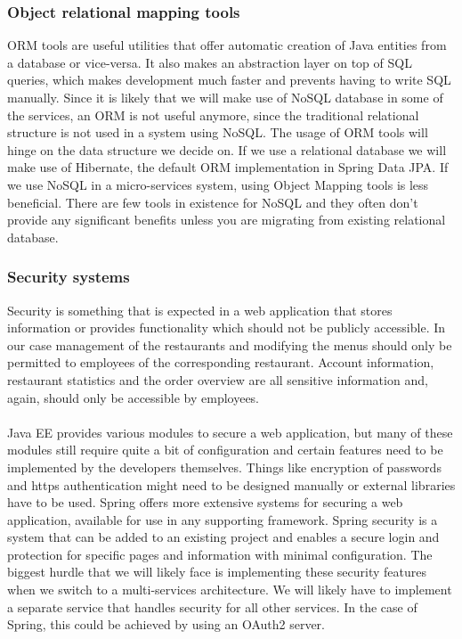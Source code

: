 \documentclass[12pt]{article}
\begin{document}
\begin{multicols}{2}
\subsubsection{Object relational mapping tools}
ORM tools are useful utilities that offer automatic creation of Java entities from a database or vice-versa. It also makes an abstraction layer on top of SQL queries, which makes development much faster and prevents having to write SQL manually. Since it is likely that we will make use of NoSQL database in some of the services, an ORM is not useful anymore, since the traditional relational structure is not used in a system using NoSQL. The usage of ORM tools will hinge on the data structure we decide on. If we use a relational database we will make use of Hibernate, the default ORM implementation in Spring Data JPA. If we use NoSQL in a micro-services system, using Object Mapping tools is less beneficial. There are few tools in existence for NoSQL and they often don't provide any significant benefits unless you are migrating from existing relational database. \cite{ormNosql85:online}
\subsubsection{Security systems}
Security is something that is expected in a web application that stores information or provides functionality which should not be publicly accessible. In our case management of the restaurants and modifying the menus should only be permitted to employees of the corresponding restaurant. Account information, restaurant statistics and the order overview are all sensitive information and, again, should only be accessible by employees.
\\\\
Java EE provides various modules to secure a web application, but many of these modules still require quite a bit of configuration and certain features need to be implemented by the developers themselves. \cite{JavaEESecurity29:online} Things like encryption of passwords and https authentication might need to be designed  manually or external libraries have to be used. Spring offers more extensive systems for securing a web application, available for use in any supporting framework. Spring security is a system that can be added to an existing project and enables a secure login and protection for specific pages and information with minimal configuration. The biggest hurdle that we will likely face is implementing these security features when we switch to a multi-services architecture. We will likely have to implement a separate service that handles security for all other services. In the case of Spring, this could be achieved by using an OAuth2 server.
\cite{SpringCloudSecurity52:online}

\end{multicols}
\end{document}

